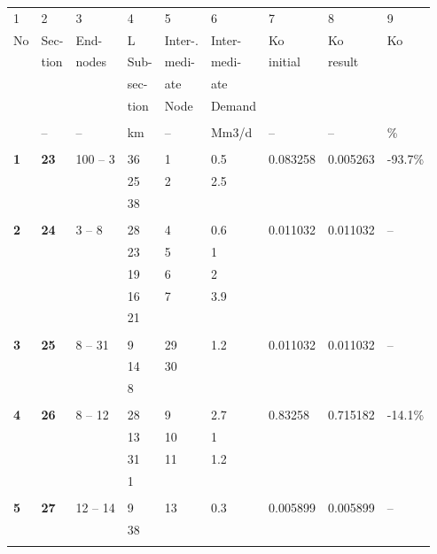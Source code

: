 \documentclass{article}
\begin{document}
\begin{tabular}{lllllllll}
1 & 2 & 3 & 4 & 5 & 6 & 7 & 8 & 9 \\ 
No & Sec- & End- & L & Inter-. & Inter- & Ko & Ko & Ko \\ 
& tion & nodes & Sub- & medi- & medi- & initial & result &  \\ 
&  &  & sec- & ate & ate &  &  &  \\ 
&  &  & tion & Node & Demand &  &  &  \\ 
&  &  &  &  &  &  &  &  \\ 
& -- & -- & km & -- & Mm3/d & -- & -- & \% \\ 
&  &  &  &  &  &  &  &  \\ 
\textbf{1} & \textbf{23} & 100 -- 3 & 36 & 1 & 0.5 & 0.083258 & 0.005263 & 
-93.7\% \\ 
&  &  & 25 & 2 & 2.5 &  &  &  \\ 
&  &  & 38 &  &  &  &  &  \\ 
&  &  &  &  &  &  &  &  \\ 
\textbf{2} & \textbf{24} & 3 -- 8 & 28 & 4 & 0.6 & 0.011032 & 0.011032 & --
\\ 
&  &  & 23 & 5 & 1 &  &  &  \\ 
&  &  & 19 & 6 & 2 &  &  &  \\ 
&  &  & 16 & 7 & 3.9 &  &  &  \\ 
&  &  & 21 &  &  &  &  &  \\ 
&  &  &  &  &  &  &  &  \\ 
\textbf{3} & \textbf{25} & 8 -- 31 & 9 & 29 & 1.2 & 0.011032 & 0.011032 & --
\\ 
&  &  & 14 & 30 &  &  &  &  \\ 
&  &  & 8 &  &  &  &  &  \\ 
&  &  &  &  &  &  &  &  \\ 
\textbf{4} & \textbf{26} & 8 -- 12 & 28 & 9 & 2.7 & 0.83258 & 0.715182 & 
-14.1\% \\ 
&  &  & 13 & 10 & 1 &  &  &  \\ 
&  &  & 31 & 11 & 1.2 &  &  &  \\ 
&  &  & 1 &  &  &  &  &  \\ 
&  &  &  &  &  &  &  &  \\ 
\textbf{5} & \textbf{27} & 12 -- 14 & 9 & 13 & 0.3 & 0.005899 & 0.005899 & --
\\ 
&  &  & 38 &  &  &  &  &  \\ 
&  &  &  &  &  &  &  & 
\end{tabular}

\bigskip
\end{document}
